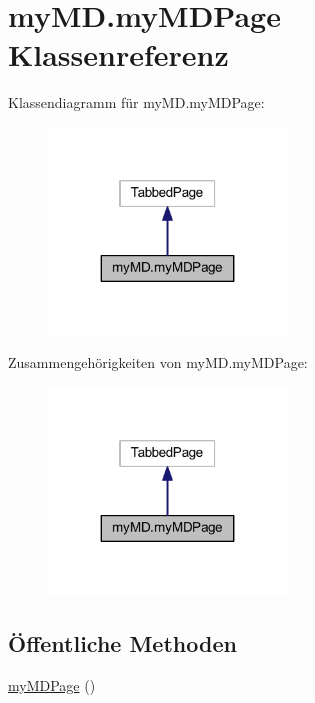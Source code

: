 \hypertarget{classmy_m_d_1_1my_m_d_page}{}\section{my\+M\+D.\+my\+M\+D\+Page Klassenreferenz}
\label{classmy_m_d_1_1my_m_d_page}


Klassendiagramm für my\+M\+D.\+my\+M\+D\+Page\+:\nopagebreak
\begin{figure}[H]
\begin{center}
\leavevmode
\includegraphics[width=179pt]{classmy_m_d_1_1my_m_d_page__inherit__graph}
\end{center}
\end{figure}


Zusammengehörigkeiten von my\+M\+D.\+my\+M\+D\+Page\+:\nopagebreak
\begin{figure}[H]
\begin{center}
\leavevmode
\includegraphics[width=179pt]{classmy_m_d_1_1my_m_d_page__coll__graph}
\end{center}
\end{figure}
\subsection*{Öffentliche Methoden}
\begin{DoxyCompactItemize}
\item 
\mbox{\hyperlink{classmy_m_d_1_1my_m_d_page_a116c2084cfab3cc170d6f0c0d32e92c7}{my\+M\+D\+Page}} ()
\end{DoxyCompactItemize}


